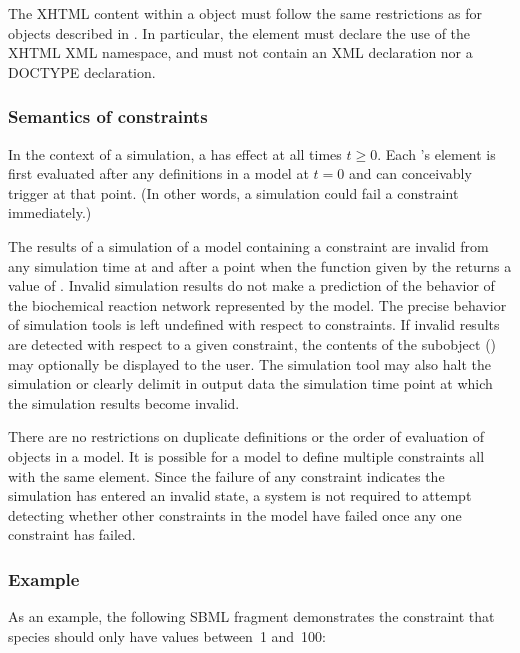 The XHTML content within a \Message object must follow the same
restrictions as for \Notes objects described in
.  In particular, the element must declare
the use of the XHTML XML namespace, and must not contain an XML
declaration nor a DOCTYPE declaration.


\subsubsection{Semantics of constraints}
\label{sec:constraint-semantics}

In the context of a simulation, a \Constraint has effect at all
times $t \geq 0$.  Each \Constraint's  element is first
evaluated after any \InitialAssignment definitions in a model at
$t = 0$ and can conceivably trigger at that point.  (In other
words, a simulation could fail a constraint immediately.)

The results of a simulation of a model containing a constraint are
invalid from any simulation time at and after a point when the
function given by the  returns a value of .
Invalid simulation results do not make a prediction of the
behavior of the biochemical reaction network represented by the
model.  The precise behavior of simulation tools is left undefined
with respect to constraints.  If invalid results are detected with
respect to a given constraint, the contents of the \Message
subobject () may optionally be
displayed to the user.  The simulation tool may also halt the
simulation or clearly delimit in output data the simulation time
point at which the simulation results become invalid.

There are no restrictions on duplicate \Constraint
definitions or the order of evaluation of \Constraint objects in a
model.  It is possible for a model to define multiple constraints
all with the same  element.  Since the failure of any
constraint indicates the simulation has entered an invalid state,
a system is not required to attempt detecting whether
other constraints in the model have failed once any one constraint
has failed.


\subsubsection{Example}

As an example, the following SBML fragment demonstrates the
constraint that species  should only have values between~1
and~100:

